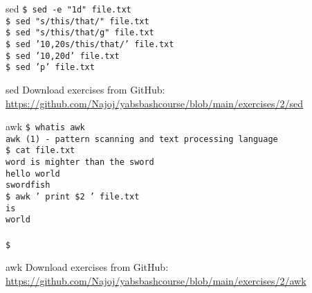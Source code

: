 \documentclass{beamer}
\let\tt\texttt
\begin{document}
\begin{frame}{sed}
        \tt{\$ sed -e "1d"             file.txt}\\
        \tt{\$ sed "s/this/that/"      file.txt}\\  
        \tt{\$ sed "s/this/that/g"     file.txt}\\  
        \tt{\$ sed '10,20s/this/that/' file.txt}\\  
        \tt{\$ sed '10,20d'            file.txt}\\  
        \tt{\$ sed 'p'                 file.txt}\\  
\end{frame}

\begin{frame}{sed}
        Download exercises from GitHub: \\
        \url{https://github.com/Najoj/yabsbashcourse/blob/main/exercises/2/sed}
\end{frame}

\begin{frame}{awk}
        \tt{\$ whatis awk}\\
        \tt{awk (1)   - pattern scanning and text processing language}\\
        \tt{\$ cat file.txt} \\
        \tt{word is mighter than the sword} \\
        \tt{hello world} \\
        \tt{swordfish} \\
        \tt{\$ awk '{ print \$2 }' file.txt} \\
        \tt{is} \\
        \tt{world} \\
        \tt{} \\
        \tt{\$ } \\
\end{frame}

\begin{frame}{awk}
        Download exercises from GitHub: \\
        \url{https://github.com/Najoj/yabsbashcourse/blob/main/exercises/2/awk}
\end{frame}
\end{document}
